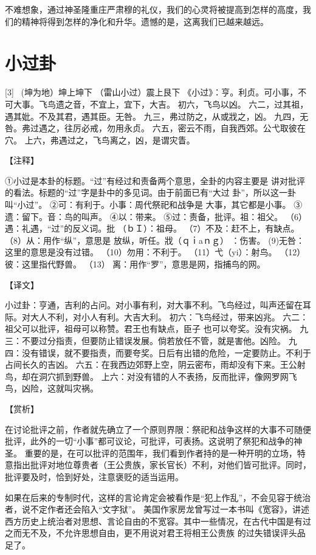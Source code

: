\documentclass[12pt,UTF8]{ctexbook}
\begin{document}
不难想象，通过神圣隆重庄严肃穆的礼仪，我们的心灵将被提高到怎样的高度，我们的精神将得到怎样的净化和升华。遗憾的是，这离我们已越来越远。

\chapter{小过卦}
[3] \ (坤为地）坤上坤下
（雷山小过）震上艮下
《小过》：亨。利贞。可小事，不可大事。飞鸟遗之音，不宜上，宜下，大吉。
初六，飞鸟以凶。
六二，过其祖，遇其妣。不及其君，遇其臣。无咎。
九三，弗过防之，从或戕之，凶。
九四，无咎。弗过遇之，往厉必戒，勿用永贞。
六五，密云不雨，自我西郊。公弋取彼在穴。
上六，弗遇过之，飞鸟离之，凶，是谓灾眚。

【注释】

①小过是本卦的标题。“过”有经过和责备两个意思，全卦的内容主要是 讲对批评的看法。标题的“过”字是卦中的多见词。由于前面已有“大过 卦”，所以这一卦叫“小过”。
②可：有利于。小事：周代祭祀和战争是 大事，其它都是小事。
③遗：留下。音：鸟的叫声。
④以：带来。
⑤过：责备，批评。祖：祖父。
（6）遇：礼遇，“过”的反义词。批 （ｂＩ）：祖母。
（7）不及：赶不上，有缺点。
（8）从：用作“纵”，意思是 放纵，听任。戕（ｑｉaｎｇ） ：伤害。
(9)无咎：这里的意思是没有过错。
（10）勿用：不利于。
（11）弋（yi）：射鸟。
（12）彼：这里指代野兽。
（13） 离：用作“罗”，意思是网，指捕鸟的网。

【译文】

小过卦：亨通，吉利的占问。对小事有利，对大事不利。飞鸟经过，叫声还留在耳际。对大人不利，对小人有利。大吉大利。
初六：飞鸟经过，带来凶兆。
六二：祖父可以批评，祖母可以称赞。君王也有缺点，臣子 也可以夸奖。没有灾祸。
九三：不要过分指责，但要防止错误发展。倘若放任不管，就是害他。凶险。
九四：没有错误，就不要指责，而要夸奖。日后有出错的危险，一定要防止。不利于占间长久的吉凶。
六五：在我西边郊野上空，阴云密布，雨却没有下来。王公射鸟，却在洞穴抓到野兽。
上六：对没有错的人不表扬，反而批评，像网罗网飞鸟，凶险，这就叫灾祸。

【赏析】

在讨论批评之前，作者就先确立了一个原则界限：祭祀和战争这样的大事不可随便批评，此外的一切“小事”都可议论，可批评，可表扬。这说明了祭犯和战争的神圣。 重要的是，在可以批评的范围年，我们看到作者持的是一种开明的立场，特意指出批评对地位尊贵者（王公贵族，家长官长）不利，对他们皆可批评。同时，批评要及时，恰到好处，注意褒贬的适当运用。

如果在后来的专制时代，这样的言论肯定会被看作是“犯上作乱”，不会见容于统治者，说不定作者还会陷入“文字狱”。 美国作家房龙曾写过一本书叫《宽容》，讲述西方历史上统治者对思想、言论自由的不宽容。其中一些情况，在古代中国是有过之而无不及，不允许思想自由，更不用说对君王将相王公贵族 的过失错误评头品足了。
\end{document}
